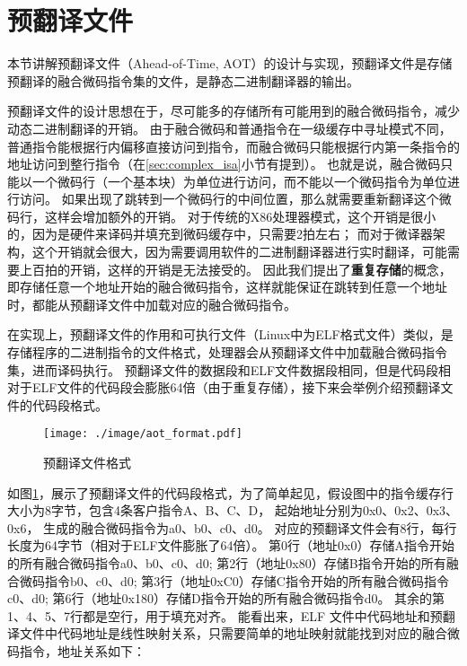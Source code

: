 \section{预翻译文件}

本节讲解预翻译文件（Ahead-of-Time, AOT）的设计与实现，预翻译文件是存储预翻译的融合微码指令集的文件，是静态二进制翻译器的输出。

预翻译文件的设计思想在于，尽可能多的存储所有可能用到的融合微码指令，减少动态二进制翻译的开销。
由于融合微码和普通指令在一级缓存中寻址模式不同，普通指令能根据行内偏移直接访问到指令，而融合微码只能根据行内第一条指令的地址访问到整行指令（在\ref{sec:complex_isa}小节有提到）。
也就是说，融合微码只能以一个微码行（一个基本块）为单位进行访问，而不能以一个微码指令为单位进行访问。
如果出现了跳转到一个微码行的中间位置，那么就需要重新翻译这个微码行，这样会增加额外的开销。
对于传统的X86处理器模式，这个开销是很小的，因为是硬件来译码并填充到微码缓存中，只需要2拍左右；
而对于微译器架构，这个开销就会很大，因为需要调用软件的二进制翻译器进行实时翻译，可能需要上百拍的开销，这样的开销是无法接受的。
因此我们提出了\textbf{重复存储}的概念，即存储任意一个地址开始的融合微码指令，这样就能保证在跳转到任意一个地址时，都能从预翻译文件中加载对应的融合微码指令。

在实现上，预翻译文件的作用和可执行文件（Linux中为ELF格式文件）类似，是存储程序的二进制指令的文件格式，处理器会从预翻译文件中加载融合微码指令集，进而译码执行。
预翻译文件的数据段和ELF文件数据段相同，但是代码段相对于ELF文件的代码段会膨胀64倍（由于重复存储），接下来会举例介绍预翻译文件的代码段格式。

\begin{figure}[h]
  \centering
  \texttt{[image: ./image/aot\_format.pdf]}
  \caption{预翻译文件格式}
  \label{img:aot_format}
\end{figure}

如图\ref{img:aot_format}，展示了预翻译文件的代码段格式，为了简单起见，假设图中的指令缓存行大小为8字节，包含4条客户指令A、B、C、D，
起始地址分别为0x0、0x2、0x3、0x6，
生成的融合微码指令为a0、b0、c0、d0。
对应的预翻译文件会有8行，每行长度为64字节（相对于ELF文件膨胀了64倍）。
第0行（地址0x0）存储A指令开始的所有融合微码指令a0、b0、c0、d0;
第2行（地址0x80）存储B指令开始的所有融合微码指令b0、c0、d0;
第3行（地址0xC0）存储C指令开始的所有融合微码指令c0、d0;
第6行（地址0x180）存储D指令开始的所有融合微码指令d0。
其余的第1、4、5、7行都是空行，用于填充对齐。
能看出来，ELF 文件中代码地址和预翻译文件中代码地址是线性映射关系，只需要简单的地址映射就能找到对应的融合微码指令，地址关系如下：

